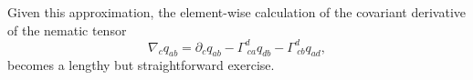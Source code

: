 Given this approximation, the element-wise calculation of the covariant derivative of the nematic tensor
\begin{equation} \label{9_34}
\nabla_c q_{ab} = \partial_c q_{ab} - \Gamma^d_{~ca} q_{db} - \Gamma^d_{~cb} q_{ad},
\end{equation}
becomes a lengthy but straightforward exercise. 

%
%
